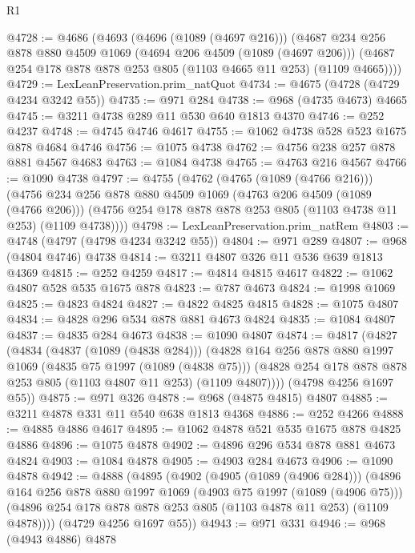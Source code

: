 \begin{lexlean}{R1}
\begin{coremodule}
@4728 := @4686
    (@4693
      (@4696 (@1089 (@4697 @216)))
      (@4687
        @234
        @256
        @878
        @880
        @4509
        @1069
        (@4694 @206 @4509 (@1089 (@4697 @206)))
        (@4687 @254 @178 @878 @878 @253 @805 (@1103 @4665 @11 @253) (@1109 @4665))))
@4729 := LexLeanPreservation.prim_natQuot
@4734 := @4675 (@4728 (@4729 @4234 @3242 @55))
@4735 := @971 @284
@4738 := @968 (@4735 @4673) @4665
@4745 := @3211 @4738 @289 @11 @530 @640 @1813 @4370
@4746 := @252 @4237
@4748 := @4745 @4746 @4617
@4755 := @1062 @4738 @528 @523 @1675 @878 @4684 @4746
@4756 := @1075 @4738
@4762 := @4756 @238 @257 @878 @881 @4567 @4683
@4763 := @1084 @4738
@4765 := @4763 @216 @4567
@4766 := @1090 @4738
@4797 := @4755
    (@4762
      (@4765 (@1089 (@4766 @216)))
      (@4756
        @234
        @256
        @878
        @880
        @4509
        @1069
        (@4763 @206 @4509 (@1089 (@4766 @206)))
        (@4756 @254 @178 @878 @878 @253 @805 (@1103 @4738 @11 @253) (@1109 @4738))))
@4798 := LexLeanPreservation.prim_natRem
@4803 := @4748 (@4797 (@4798 @4234 @3242 @55))
@4804 := @971 @289
@4807 := @968 (@4804 @4746) @4738
@4814 := @3211 @4807 @326 @11 @536 @639 @1813 @4369
@4815 := @252 @4259
@4817 := @4814 @4815 @4617
@4822 := @1062 @4807 @528 @535 @1675 @878
@4823 := @787 @4673
@4824 := @1998 @1069
@4825 := @4823 @4824
@4827 := @4822 @4825 @4815
@4828 := @1075 @4807
@4834 := @4828 @296 @534 @878 @881 @4673 @4824
@4835 := @1084 @4807
@4837 := @4835 @284 @4673
@4838 := @1090 @4807
@4874 := @4817
    (@4827
      (@4834
        (@4837 (@1089 (@4838 @284)))
        (@4828
          @164
          @256
          @878
          @880
          @1997
          @1069
          (@4835 @75 @1997 (@1089 (@4838 @75)))
          (@4828 @254 @178 @878 @878 @253 @805 (@1103 @4807 @11 @253) (@1109 @4807))))
      (@4798 @4256 @1697 @55))
@4875 := @971 @326
@4878 := @968 (@4875 @4815) @4807
@4885 := @3211 @4878 @331 @11 @540 @638 @1813 @4368
@4886 := @252 @4266
@4888 := @4885 @4886 @4617
@4895 := @1062 @4878 @521 @535 @1675 @878 @4825 @4886
@4896 := @1075 @4878
@4902 := @4896 @296 @534 @878 @881 @4673 @4824
@4903 := @1084 @4878
@4905 := @4903 @284 @4673
@4906 := @1090 @4878
@4942 := @4888
    (@4895
      (@4902
        (@4905 (@1089 (@4906 @284)))
        (@4896
          @164
          @256
          @878
          @880
          @1997
          @1069
          (@4903 @75 @1997 (@1089 (@4906 @75)))
          (@4896 @254 @178 @878 @878 @253 @805 (@1103 @4878 @11 @253) (@1109 @4878))))
      (@4729 @4256 @1697 @55))
@4943 := @971 @331
@4946 := @968 (@4943 @4886) @4878

\end{coremodule}
\end{lexlean}

